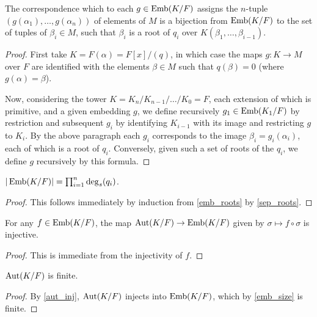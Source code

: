 \begin{lemma} The correspondence which to each $g \in \operatorname{\text{Emb}}(K/F)$ assigns the
$n$-tuple $(g(\alpha_1), \dots, g(\alpha_n))$ of elements of $M$ is a
bijection from $\operatorname{\text{Emb}}(K/F)$ to the set of tuples of $\beta_i \in M$, such that
$\beta_i$ is a root of $q_i$ over $K(\beta_1, \dots, \beta_{i - 1})$.
\label{emb_roots}
\end{lemma}

\begin{proof} First take $K = F(\alpha) = F[x]/(q)$, in which case the maps $g
\colon K \to M$ over $F$ are identified with the elements $\beta \in M$ such
that $q(\beta) = 0$ (where $g(\alpha) = \beta$).

Now, considering the tower $K = K_n / K_{n - 1} / \dots / K_0 = F$, each
extension of which is primitive, and a given embedding $g$, we define
recursively $g_1 \in \operatorname{\text{Emb}}(K_1/F)$ by restriction and subsequent $g_i$ by
identifying $K_{i - 1}$ with its image and restricting $g$ to $K_i$.  By the
above paragraph each $g_i$ corresponds to the image $\beta_i = g_i(\alpha_i)$,
each of which is a root of $q_i$.  Conversely, given such a set of roots of
the $q_i$, we define $g$ recursively by this formula. \end{proof}

\begin{corollary} $|\operatorname{\text{Emb}}(K/F)| = \prod_{i = 1}^n \deg_s(q_i)$.
\label{emb_size}
\end{corollary}

\begin{proof} This follows immediately by induction from \cref{emb_roots} by
\cref{sep_roots}. \end{proof}

\begin{lemma} For any $f \in \operatorname{\text{Emb}}(K/F)$, the map $\operatorname{\text{Aut}}(K/F) \to \operatorname{\text{Emb}}(K/F)$ given
by $\sigma \mapsto f \circ \sigma$ is injective.  
\label{aut_inj}
\end{lemma}

\begin{proof} This is immediate from the injectivity of $f$. \end{proof}

\begin{corollary} $\operatorname{\text{Aut}}(K/F)$ is finite.
\label{aut_fin}
\end{corollary}

\begin{proof} By \cref{aut_inj}, $\operatorname{\text{Aut}}(K/F)$ injects into $\operatorname{\text{Emb}}(K/F)$, which by
\cref{emb_size} is finite. \end{proof}

